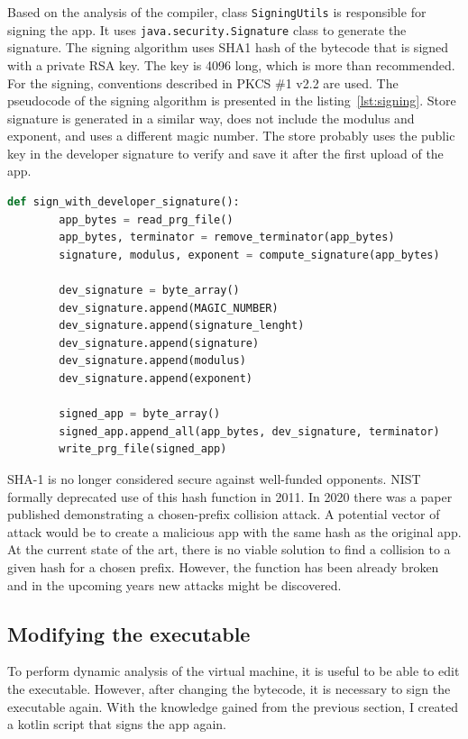 Based on the analysis of the compiler, class \texttt{SigningUtils} is responsible for signing the app.
It uses \texttt{java.security.Signature} class to generate the signature.
The signing algorithm uses SHA1 hash of the bytecode that is signed with a private RSA key.
The key is 4096 long, which is more than recommended.
For the signing, conventions described in PKCS \#1 v2.2 are used\cite{java-signature,pkcs}.
The pseudocode of the signing algorithm is presented in the listing~\ref{lst:signing}.
Store signature is generated in a similar way, does not include the modulus and exponent, and uses a different magic number.
The store probably uses the public key in the developer signature to verify and save it after the first upload of the app.
\begin{lstlisting}[caption={Signing algorithm, developer signature},captionpos=b,label={lst:signing},language=Python]
    def sign_with_developer_signature():
        app_bytes = read_prg_file()
        app_bytes, terminator = remove_terminator(app_bytes)
        signature, modulus, exponent = compute_signature(app_bytes)

        dev_signature = byte_array()
        dev_signature.append(MAGIC_NUMBER)
        dev_signature.append(signature_lenght)
        dev_signature.append(signature)
        dev_signature.append(modulus)
        dev_signature.append(exponent)

        signed_app = byte_array()
        signed_app.append_all(app_bytes, dev_signature, terminator)
        write_prg_file(signed_app)
\end{lstlisting}

SHA-1 is no longer considered secure against well-funded opponents.
NIST formally deprecated use of this hash function in 2011.
In 2020 there was a paper published demonstrating a chosen-prefix collision attack.
A potential vector of attack would be to create a malicious app with the same hash as the original app.
At the current state of the art, there is no viable solution to find a collision to a given hash for a chosen prefix.
However, the function has been already broken and in the upcoming years new attacks might be discovered.

\subsection{Modifying the executable}
To perform dynamic analysis of the virtual machine, it is useful to be able to edit the executable.
However, after changing the bytecode, it is necessary to sign the executable again.
With the knowledge gained from the previous section, I created a kotlin script that signs the app again.

